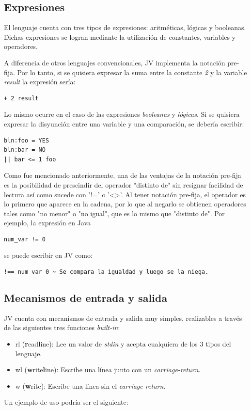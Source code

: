\documentclass{article}
\begin{document}
        \subsection{Expresiones}
            \par El lenguaje cuenta con tres tipos de expresiones: aritméticas, lógicas y booleanas. Dichas expresiones se logran mediante la utilización de constantes, variables y operadores.
            \par A diferencia de otros lenguajes convencionales, JV implementa la notación pre-fija. Por lo tanto, si se quisiera expresar la suma entre la constante \textit{2} y la variable \textit{result} la expresión sería:
            \begin{lstlisting}
+ 2 result
            \end{lstlisting}
            Lo mismo ocurre en el caso de las expresiones \textit{booleanas} y \textit{lógicas}. Si se quisiera expresar la disyunción entre una variable y una comparación, se debería escribir: 
            \begin{lstlisting}
bln:foo = YES
bln:bar = NO
|| bar <= 1 foo
            \end{lstlisting}
            \par Como fue mencionado anteriormente, una de las ventajas de la notación pre-fija es la posibilidad de prescindir del operador "distinto de" sin resignar facilidad de lectura así como sucede con '!=' o '<>'. Al tener notación pre-fija, el operador es lo primero que aparece en la cadena, por lo que al negarlo se obtienen operadores tales como "no menor" o "no igual", que es lo mismo que "distinto de". Por ejemplo, la expresión en Java
            \begin{lstlisting}
num_var != 0
            \end{lstlisting}
            se puede escribir en JV como:
            \begin{lstlisting}
!== num_var 0 ~ Se compara la igualdad y luego se la niega.
            \end{lstlisting}
        \clearpage
        
        \subsection{Mecanismos de entrada y salida}
            \par JV cuenta con mecanismos de entrada y salida muy simples, realizables a través de las siguientes tres funciones \textit{built-in}:
            \begin{itemize}
                \item rl (\textbf{r}ead\textbf{l}ine): Lee un valor de \textit{stdin} y acepta cualquiera de los 3 tipos del lenguaje.
                \item wl (\textbf{w}rite\textbf{l}ine): Escribe una línea junto con un \textit{carriage-return}.
                \item w (\textbf{w}rite): Escribe una línea sin el \textit{carriage-return}.
            \end{itemize}
            \par Un ejemplo de uso podría ser el siguiente:
\end{document}
